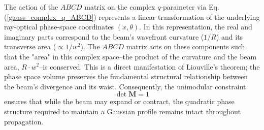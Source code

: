 The action of the $ABCD$ matrix on the complex $q$-parameter via Eq. (\ref{gauss_complex_q_ABCD}) represents a linear transformation of the underlying ray-optical phase-space coordinates $(x, \theta)$. In this representation, the real and imaginary parts correspond to the beam's wavefront curvature ($1/R$) and its transverse area ($\propto 1/w^2$). The $ABCD$ matrix acts on these components such that the "area" in this complex space--the product of the curvature and the beam area, $R \cdot w^2$--is conserved. This is a direct manifestation of Liouville’s theorem; the phase space volume preserves the fundamental structural relationship between the beam's divergence and its waist. Consequently, the unimodular constraint
\begin{equation}
	\det \mathbf{M} = 1
\end{equation}
ensures that while the beam may expand or contract, the quadratic phase structure required to maintain a Gaussian profile remains intact throughout propagation.

